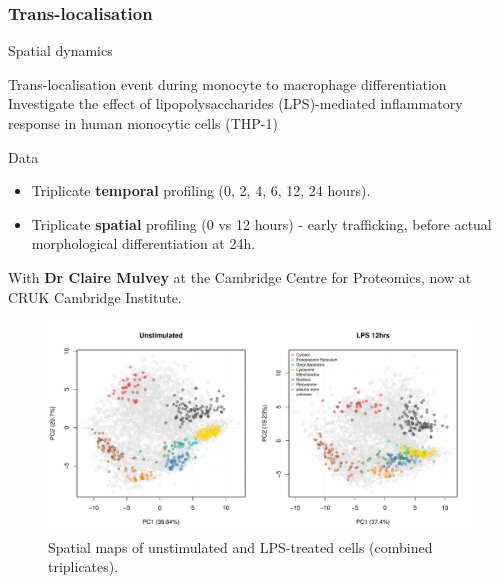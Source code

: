 \subsubsection{Trans-localisation}

\begin{frame}{Spatial dynamics}
  \begin{block}{Trans-localisation event during monocyte to macrophage
      differentiation}
    Investigate the effect of lipopolysaccharides (LPS)-mediated
    inflammatory response in human monocytic cells (THP-1)
  \end{block}

  \begin{block}{Data}
    \begin{itemize}
    \item Triplicate \textbf{temporal} profiling (0, 2, 4, 6, 12, 24
      hours).
    \item Triplicate \textbf{spatial} profiling (0 vs 12 hours) -
      early trafficking, before actual morphological differentiation
      at 24h.
    \end{itemize}
  \end{block}

  With \textbf{Dr Claire Mulvey} at the Cambridge Centre for
  Proteomics, now at CRUK Cambridge Institute.

\end{frame}



\begin{frame}
  \begin{figure}[h]
    \centering
    \includegraphics[width=\linewidth]{./figs_local/lps.pdf}
    \caption{Spatial maps of unstimulated and LPS-treated cells
      (combined triplicates).}
  \end{figure}
\end{frame}

